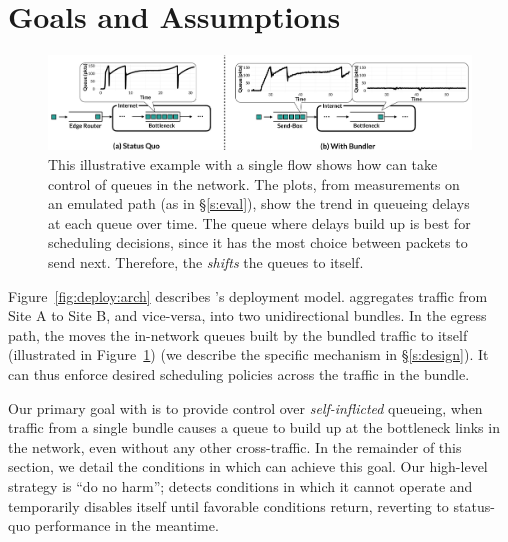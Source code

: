 \section{Goals and Assumptions}\label{s:deploy}
\begin{figure}[t]
    \centering
    \includegraphics[width=\textwidth]{img/shift-bottleneck-combined}
    \caption{This illustrative example with a single flow shows how \name can take control of queues in the network. The plots, from measurements on an emulated path (as in \S\ref{s:eval}), show the trend in queueing delays at each queue over time. The queue where delays build up is best for scheduling decisions, since it has the most choice between packets to send next. Therefore, the \inbox \emph{shifts} the queues to itself.}\label{fig:design:shift-bottleneck}
\end{figure}
%



Figure~\ref{fig:deploy:arch} describes \name's deployment model. 
\name aggregates traffic from Site A to Site B, and vice-versa, into two unidirectional bundles. 
In the egress path, the \inbox moves the in-network queues built by the bundled traffic to itself (illustrated in Figure~\ref{fig:design:shift-bottleneck}) (we describe the specific mechanism in \S\ref{s:design}). 
It can thus enforce desired scheduling policies across the traffic in the bundle.

Our primary goal with \name is to provide control over \emph{self-inflicted} queueing, \ie when traffic from a single bundle causes a queue to build up at the bottleneck links in the network, even without any other cross-traffic.
In the remainder of this section, we detail the conditions in which \name can achieve this goal. Our high-level strategy is ``do no harm''; \name detects conditions in which it cannot operate and temporarily disables itself until favorable conditions return, reverting to status-quo performance in the meantime.

